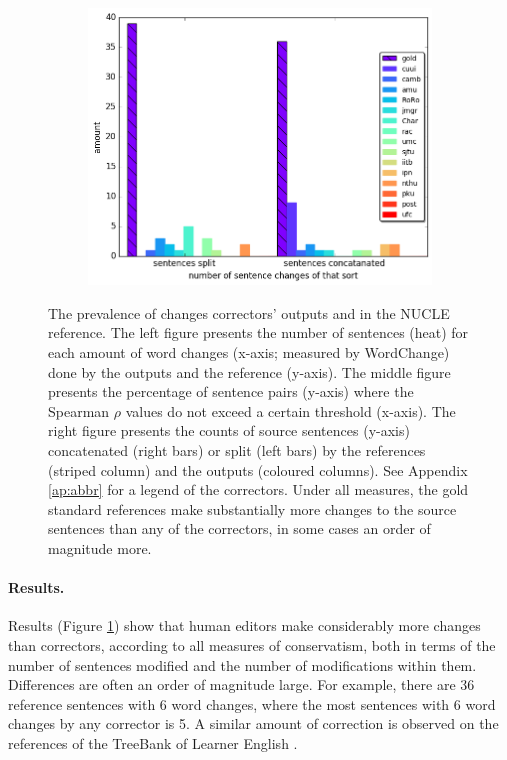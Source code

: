 \documentclass[a4paper, 11pt]{article}
\begin{document}
\begin{figure}
\begin{subfigure}[]{0.6\columnwidth}
		\includegraphics[width = \textwidth]{aligned}
	\end{subfigure}
	\caption{\label{fig:over-conservatism}
		The prevalence of changes correctors' outputs and in the NUCLE reference.
		The left figure presents the number of sentences (heat) for each amount of word changes
		(x-axis; measured by {\sc WordChange}) done by the outputs and the reference (y-axis).
		The middle figure presents the percentage of sentence pairs (y-axis) where the
		Spearman $\rho$ values do not exceed a certain threshold (x-axis).
		The right figure presents the counts of source sentences (y-axis) concatenated (right bars) or split (left bars) by the references (striped column) and the outputs (coloured columns).
		See Appendix  \ref{ap:abbr} for a legend of the correctors.
		Under all measures, the gold standard references make substantially more changes to the source sentences than any of the correctors, in some cases an order of magnitude more.
	}
	\vspace{-0.4cm}
\end{figure}

\vspace{-.2cm}
\paragraph{Results.}
Results (Figure \ref{fig:over-conservatism}) show that human editors make considerably more changes than correctors, according to all measures of conservatism, both in terms of the number of sentences modified and the number of modifications within them. Differences are often an order of magnitude large.
For example, there are 36 reference sentences with 6 word changes, where the most sentences with 6 word changes by any corrector is 5.
A similar amount of correction is observed on the references of the TreeBank of Learner English \cite{yannakoudakis2011new}.
\end{document}
